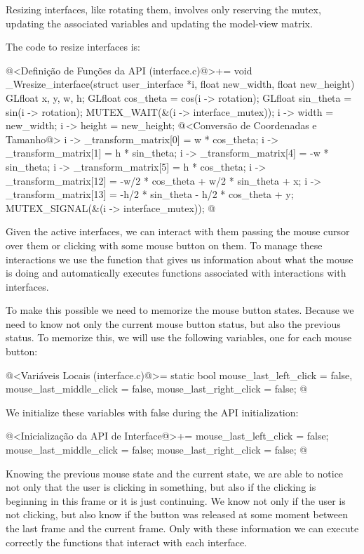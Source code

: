 
Resizing interfaces, like rotating them, involves only reserving the
mutex, updating the associated variables and updating the model-view
matrix.

The code to resize interfaces is:

\iniciocodigo
@<Definição de Funções da API (interface.c)@>+=
void _Wresize_interface(struct user_interface *i,
                        float new_width, float new_height){
  GLfloat x, y, w, h;
  GLfloat cos_theta = cos(i -> rotation);
  GLfloat sin_theta = sin(i -> rotation);
  MUTEX_WAIT(&(i -> interface_mutex));
  i -> width = new_width;
  i -> height = new_height;
  @<Conversão de Coordenadas e Tamanho@>
  i -> _transform_matrix[0] = w * cos_theta;
  i -> _transform_matrix[1] = h * sin_theta;
  i -> _transform_matrix[4] = -w * sin_theta;
  i -> _transform_matrix[5] = h * cos_theta;
  i -> _transform_matrix[12] = -w/2 * cos_theta + w/2 * sin_theta + x;
  i -> _transform_matrix[13] = -h/2 * sin_theta - h/2 * cos_theta + y;
  MUTEX_SIGNAL(&(i -> interface_mutex));
}
@
\fimcodigo


Given the active interfaces, we can interact with them passing the
mouse cursor over them or clicking with some mouse button on them. To
manage these interactions we use the
function  that gives us information
about what the mouse is doing and automatically executes functions
associated with interactions with interfaces.

To make this possible we need to memorize the mouse button
states. Because we need to know not only the current mouse button
status, but also the previous status. To memorize this, we will use
the following variables, one for each mouse button:

\iniciocodigo
@<Variáveis Locais (interface.c)@>=
static bool mouse_last_left_click = false, mouse_last_middle_click = false,
  mouse_last_right_click = false;
@
\fimcodigo

We initialize these variables with false during the API
initialization:

\iniciocodigo
@<Inicialização da API de Interface@>+=
mouse_last_left_click = false;
mouse_last_middle_click = false;
mouse_last_right_click = false;
@
\fimcodigo

Knowing the previous mouse state and the current state, we are able to
notice not only that the user is clicking in something, but also if
the clicking is beginning in this frame or it is just continuing. We
know not only if the user is not clicking, but also know if the button
was released at some moment between the last frame and the current
frame. Only with these information we can execute correctly the
functions that interact with each interface.


